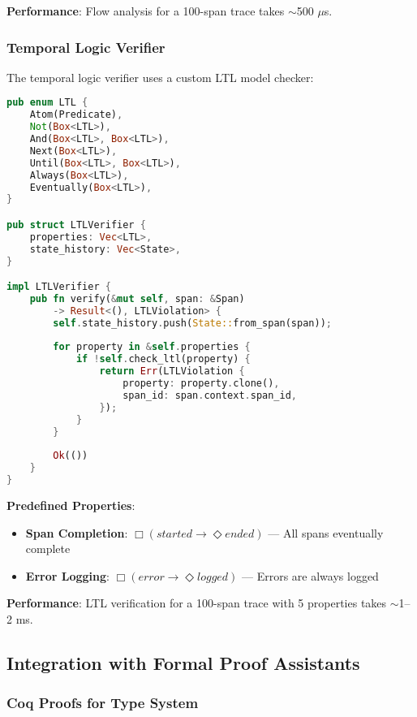 \textbf{Performance}: Flow analysis for a 100-span trace takes $\sim$500 $\mu$s.

\subsubsection{Temporal Logic Verifier}

The temporal logic verifier uses a custom LTL model checker:

\begin{small}
\begin{lstlisting}[language=Rust]
pub enum LTL {
    Atom(Predicate),
    Not(Box<LTL>),
    And(Box<LTL>, Box<LTL>),
    Next(Box<LTL>),
    Until(Box<LTL>, Box<LTL>),
    Always(Box<LTL>),
    Eventually(Box<LTL>),
}

pub struct LTLVerifier {
    properties: Vec<LTL>,
    state_history: Vec<State>,
}

impl LTLVerifier {
    pub fn verify(&mut self, span: &Span) 
        -> Result<(), LTLViolation> {
        self.state_history.push(State::from_span(span));
        
        for property in &self.properties {
            if !self.check_ltl(property) {
                return Err(LTLViolation {
                    property: property.clone(),
                    span_id: span.context.span_id,
                });
            }
        }
        
        Ok(())
    }
}
\end{lstlisting}
\end{small}

\textbf{Predefined Properties}:
\begin{itemize}
\item \textbf{Span Completion}: $\Box(\textit{started} \rightarrow \Diamond\textit{ended})$ --- All spans eventually complete
\item \textbf{Error Logging}: $\Box(\textit{error} \rightarrow \Diamond\textit{logged})$ --- Errors are always logged
\end{itemize}

\textbf{Performance}: LTL verification for a 100-span trace with 5 properties takes $\sim$1--2 ms.

\subsection{Integration with Formal Proof Assistants}
\label{sec:impl-proofs}

\subsubsection{Coq Proofs for Type System}

